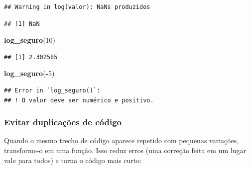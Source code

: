 \documentclass[
]{book}
\newenvironment{Shaded}{\begin{snugshade}}{\end{snugshade}}
\newcommand{\DecValTok}[1]{\textcolor[rgb]{0.00,0.00,0.81}{#1}}
\newcommand{\FunctionTok}[1]{\textcolor[rgb]{0.13,0.29,0.53}{\textbf{#1}}}
\newcommand{\NormalTok}[1]{#1}
\newcommand{\SpecialCharTok}[1]{\textcolor[rgb]{0.81,0.36,0.00}{\textbf{#1}}}
\begin{document}
\begin{verbatim}
## Warning in log(valor): NaNs produzidos
\end{verbatim}

\begin{verbatim}
## [1] NaN
\end{verbatim}

\begin{Shaded}
\begin{Highlighting}[]
\FunctionTok{log\_seguro}\NormalTok{(}\DecValTok{10}\NormalTok{)}
\end{Highlighting}
\end{Shaded}

\begin{verbatim}
## [1] 2.302585
\end{verbatim}

\begin{Shaded}
\begin{Highlighting}[]
\FunctionTok{log\_seguro}\NormalTok{(}\SpecialCharTok{{-}}\DecValTok{5}\NormalTok{)}
\end{Highlighting}
\end{Shaded}

\begin{verbatim}
## Error in `log_seguro()`:
## ! O valor deve ser numérico e positivo.
\end{verbatim}

\subsubsection{Evitar duplicações de código}\label{evitar-duplicauxe7uxf5es-de-cuxf3digo}

Quando o mesmo trecho de código aparece repetido com pequenas variações, transforme-o em uma função. Isso reduz erros (uma correção feita em um lugar vale para todos) e torna o código mais curto:
\end{document}
